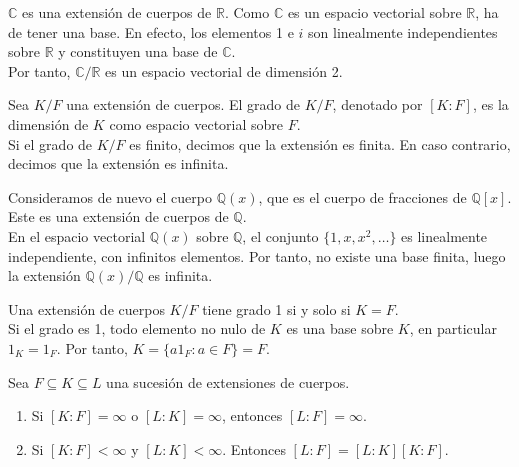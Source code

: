 \begin{example}
    $\mathbb{C}$ es una extensión de cuerpos de $\mathbb{R}$. Como $\mathbb{C}$ es un espacio vectorial sobre $\mathbb{R}$, ha de tener una base.
    En efecto, los elementos 1 e $i$ son linealmente independientes sobre $\mathbb{R}$ y constituyen una base de $\mathbb{C}$.\\
    Por tanto, $\mathbb{C}/\mathbb{R}$ es un espacio vectorial de dimensión 2.
\end{example}

\begin{definition}
    Sea $K/F$ una extensión de cuerpos. El grado de $K/F$, denotado por $[K : F]$, es la dimensión de $K$ como espacio vectorial sobre $F$.\\
    Si el grado de $K/F$ es finito, decimos que la extensión es finita. En caso contrario, decimos que la extensión es infinita.
\end{definition}

\begin{example}
    Consideramos de nuevo el cuerpo $\mathbb{Q}(x)$, que es el cuerpo de fracciones de $\mathbb{Q}[x]$. Este es una extensión de cuerpos de $\mathbb{Q}$.\\
    En el espacio vectorial $\mathbb{Q}(x)$ sobre $\mathbb{Q}$, el conjunto $\{1, x, x^2, \dots\}$ es linealmente independiente, con infinitos elementos.
    Por tanto, no existe una base finita, luego la extensión $\mathbb{Q}(x)/\mathbb{Q}$ es infinita.
\end{example}

\begin{remark}
    Una extensión de cuerpos $K/F$ tiene grado 1 si y solo si $K = F$.\\
    Si el grado es 1, todo elemento no nulo de $K$ es una base sobre $K$, en particular $1_K = 1_F$. Por tanto, $K = \{ a1_F : a \in F \}  = F$.
\end{remark}

\begin{theorem}
    Sea $F \subseteq K \subseteq L$ una sucesión de extensiones de cuerpos.
    \begin{enumerate}
        \item Si $[K : F] = \infty$ o $[L : K] = \infty$, entonces $[L : F] = \infty$.
        \item Si $[K : F] < \infty$ y $[L : K] < \infty$. Entonces $[L : F] = [L : K] [K : F]$.
    \end{enumerate}
\end{theorem}

